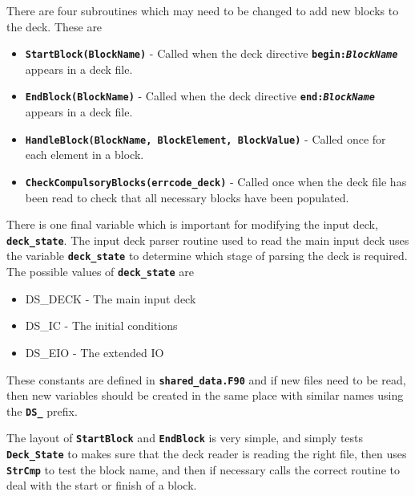 \documentclass[12pt,a4paper]{article}
\newcommand{\inlinecode}[1]{{\color{warwickred} \bf\texttt{#1}}}
\begin{document}
There are four subroutines which may need to be changed to add new blocks to
the deck. These are
\begin{itemize}
\item \inlinecode{StartBlock(BlockName)} - Called when the deck directive
  \inlinecode{begin:{\it BlockName}} appears in a deck file.
\item \inlinecode{EndBlock(BlockName)} - Called when the deck directive
  \inlinecode{end:{\it BlockName}} appears in a deck file.
\item \inlinecode{HandleBlock(BlockName, BlockElement, BlockValue)} - Called once
  for each element in a block.
\item \inlinecode{CheckCompulsoryBlocks(errcode\_deck)} - Called once when the
  deck file has been read to check that all necessary blocks have been
  populated.
\end{itemize}

There is one final variable which is important for modifying the input deck,
\inlinecode{deck\_state}. The input deck parser routine used to read the main
input deck uses the variable \inlinecode{deck\_state} to
determine which stage of parsing the deck is required. The possible values of
\inlinecode{deck\_state} are

\begin{itemize}
\item DS\_DECK - The main input deck
\item DS\_IC - The initial conditions
\item DS\_EIO - The extended IO
\end{itemize}
These constants are defined in \inlinecode{shared\_data.F90} and if new files
need to be read, then new variables should be created in the same place with
similar names using the \inlinecode{DS\_} prefix.

The layout of \inlinecode{StartBlock} and \inlinecode{EndBlock} is very simple,
and simply tests \inlinecode{Deck\_State} to makes sure that the deck reader is
reading the right file, then uses \inlinecode{StrCmp} to test the block name,
and then if necessary calls the correct routine to deal with the start or
finish of a block.
\end{document}
